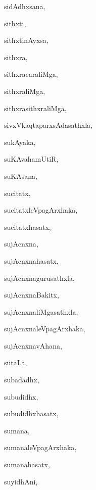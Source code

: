 \begin{multicols}{3}
{\noindent
{sidAdhxsana}, \pageref{sidAdhxsana}

\noindent
{sithxti}, \pageref{sithxti}

\noindent
{sithxtinAyxsa}, \pageref{sithxtinAyxsa}

\noindent
{sithxra}, \pageref{sithxra}

\noindent
{sithxracaraliMga}, \pageref{sithxracaraliMga}

\noindent
{sithxraliMga}, \pageref{sithxraliMga}

\noindent
{sithxrasithxraliMga}, \pageref{sithxrasithxraliMga}

\noindent
{sivxVkaqtaparxsAdasathxla}, \pageref{sivxVkaqtaparxsAdasathxla}

\noindent
{sukAyaka}, \pageref{sukAyaka}

\noindent
{suKAvahamUtiR}, \pageref{suKAvahamUtiR}

\noindent
{suKAsana}, \pageref{suKAsana}

\noindent
{sucitatx}, \pageref{sucitatx}

\noindent
{sucitatxleVpagArxhaka}, \pageref{sucitatxleVpagArxhaka}

\noindent
{sucitatxhasatx}, \pageref{sucitatxhasatx}

\noindent
{sujAcnxna}, \pageref{sujAcnxna}

\noindent
{sujAcnxnahasatx}, \pageref{sujAcnxnahasatx}

\noindent
{sujAcnxnagurusathxla}, \pageref{sujAcnxnagurusathxla}

\noindent
{sujAcnxnaBakitx}, \pageref{sujAcnxnaBakitx}

\noindent
{sujAcnxnaliMgasathxla}, \pageref{sujAcnxnaliMgasathxla}

\noindent
{sujAcnxnaleVpagArxhaka}, \pageref{sujAcnxnaleVpagArxhaka}

\noindent
{sujAcnxnavAhana}, \pageref{sujAcnxnavAhana}

\noindent
{sutaLa}, \pageref{sutaLa}

\noindent
{subadadhx}, \pageref{subadadhx}

\noindent
{subudidhx}, \pageref{subudidhx}

\noindent
{subudidhxhasatx}, \pageref{subudidhxhasatx}

\noindent
{sumana}, \pageref{sumana}

\noindent
{sumanaleVpagArxhaka}, \pageref{sumanaleVpagArxhaka}

\noindent
{sumanahasatx}, \pageref{sumanahasatx}

\noindent
{suyidhAni}, \pageref{suyidhAni}

}
\end{multicols}
